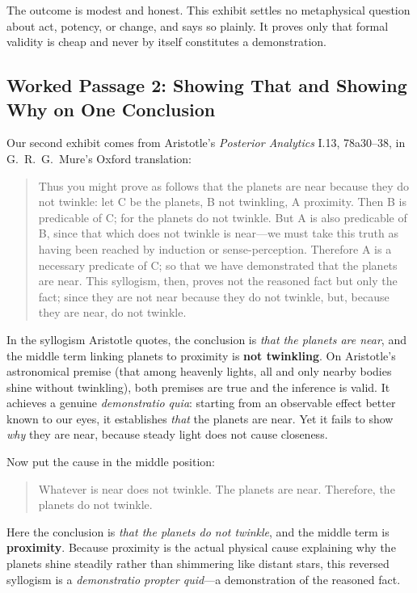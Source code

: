 The outcome is modest and honest. This exhibit settles no metaphysical question about act, potency, or change, and says so plainly. It proves only that formal validity is cheap and never by itself constitutes a demonstration.

\subsection{Worked Passage 2: Showing That and Showing Why on One Conclusion}

Our second exhibit comes from Aristotle's \emph{Posterior Analytics} I.13, 78a30--38, in G.\ R.\ G.\ Mure's Oxford translation:

\begin{quote}
Thus you might prove as follows that the planets are near because they do not twinkle: let C be the planets, B not twinkling, A proximity. Then B is predicable of C; for the planets do not twinkle. But A is also predicable of B, since that which does not twinkle is near---we must take this truth as having been reached by induction or sense-perception. Therefore A is a necessary predicate of C; so that we have demonstrated that the planets are near. This syllogism, then, proves not the reasoned fact but only the fact; since they are not near because they do not twinkle, but, because they are near, do not twinkle.
\end{quote}

In the syllogism Aristotle quotes, the conclusion is \emph{that the planets are near}, and the middle term linking planets to proximity is \textbf{not twinkling}. On Aristotle's astronomical premise (that among heavenly lights, all and only nearby bodies shine without twinkling), both premises are true and the inference is valid. It achieves a genuine \emph{demonstratio quia}: starting from an observable effect better known to our eyes, it establishes \emph{that} the planets are near. Yet it fails to show \emph{why} they are near, because steady light does not cause closeness.

Now put the cause in the middle position:

\begin{quote}
Whatever is near does not twinkle. The planets are near. Therefore, the planets do not twinkle.
\end{quote}

Here the conclusion is \emph{that the planets do not twinkle}, and the middle term is \textbf{proximity}. Because proximity is the actual physical cause explaining why the planets shine steadily rather than shimmering like distant stars, this reversed syllogism is a \emph{demonstratio propter quid}---a demonstration of the reasoned fact.

